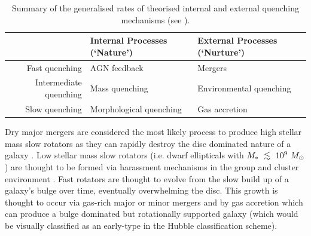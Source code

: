 \documentclass[useAMS,usenatbib]{mn2e}
\def\lesssim{\mathrel{\hbox{\rlap{\hbox{\lower3pt\hbox{$\sim$}}}\hbox{\raise2pt\hbox{$<$}}}}}
\begin{document}
\begin{table}
\centering
\caption{Summary of the generalised rates of theorised internal and external quenching mechanisms (see \protect\citealt{smethurst17}).}
\label{table:qm}
%
\begin{tabularx}{\textwidth}{r|C|C}
\hline
{}  & Internal Processes (`Nature')      & External Processes (`Nurture')     \\ \hline
Fast quenching         & AGN feedback            & Mergers           \\
Intermediate quenching & Mass quenching          & Environmental quenching \\
Slow quenching         & Morphological quenching & Gas accretion           \\ \hline
\end{tabularx}
\end{table}

Dry major mergers are considered the most likely process to produce high stellar mass slow rotators \citep{duc11, naab14} as they can rapidly destroy the disc dominated nature of a galaxy \citep{toomre72}. Low stellar mass slow rotators (i.e. dwarf ellipticals with $M_*~\lesssim~10^9~M_{\odot}$) are thought to be formed via harassment mechanisms in the group and cluster environment \citep{toloba15}. %
Fast rotators are thought to evolve from the slow build up of a galaxy's bulge over time, eventually overwhelming the disc. This growth is thought to occur via gas-rich major or minor mergers \citep{duc11} and by gas accretion \citep{cappellari13, johnston14} which can produce a bulge dominated but rotationally supported galaxy (which would be visually classified as an early-type in the Hubble classification scheme). %
\end{document}
